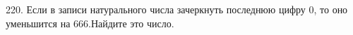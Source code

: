 220. Если в записи натурального числа зачеркнуть последнюю цифру 0, то оно уменьшится на 666.Найдите это число.\\
